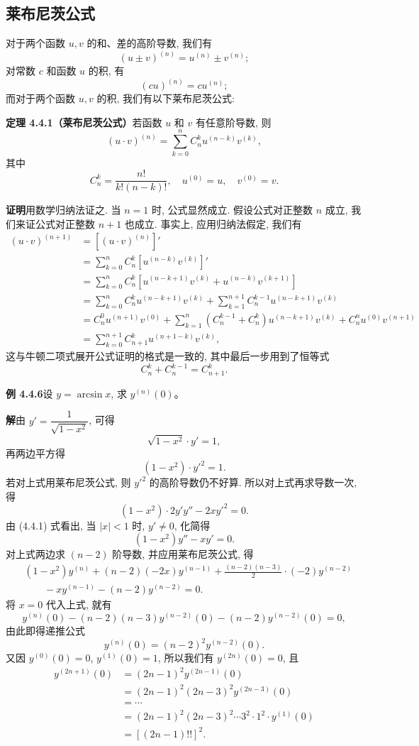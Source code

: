 \documentclass[UTF8,12pt,a4paper,fontset=fandol]{ctexart}
\begin{document}
\subsection{莱布尼茨公式}

对于两个函数 $u,v$ 的和、差的高阶导数, 我们有
\[
  (u\pm v)^{(n)}=u^{(n)}\pm v^{(n)};
\]
对常数 $c$ 和函数 $u$ 的积, 有
\[
  (cu)^{(n)}=cu^{(n)};
\]
而对于两个函数 $u,v$ 的积, 我们有以下莱布尼茨公式:

\noindent\textbf{定理 4.4.1（莱布尼茨公式）}\quad 若函数 $u$ 和 $v$ 有任意阶导数, 则
\[
  (u\cdot v)^{(n)}
  =
  \sum_{k=0}^{n}C_n^ku^{(n-k)}v^{(k)},
\]
其中
\[
  C_n^k=\frac{n!}{k!(n-k)!},\quad u^{(0)}=u,\quad v^{(0)}=v.
\]

\noindent\textbf{证明}\quad 用数学归纳法证之. 当 $n=1$ 时, 公式显然成立. 假设公式对正整数 $n$ 成立, 我们来证公式对正整数 $n+1$ 也成立. 事实上, 应用归纳法假定, 我们有
\[
\begin{aligned}
  (u\cdot v)^{(n+1)}
  &=
  \left[(u\cdot v)^{(n)}\right]'  \\
  &=
  \sum_{k=0}^{n}C_n^k\left[u^{(n-k)}v^{(k)}\right]'  \\
  &=
  \sum_{k=0}^{n}C_n^k
  \left[u^{(n-k+1)}v^{(k)}+u^{(n-k)}v^{(k+1)}\right]  \\
  &=
  \sum_{k=0}^{n}C_n^ku^{(n-k+1)}v^{(k)}
  +
  \sum_{k=1}^{n+1}C_n^{k-1}u^{(n-k+1)}v^{(k)}  \\
  &=
  C_n^0u^{(n+1)}v^{(0)}
  +
  \sum_{k=1}^{n}(C_n^{k-1}+C_n^k)u^{(n-k+1)}v^{(k)}
  +
  C_n^nu^{(0)}v^{(n+1)}  \\
  &=
  \sum_{k=0}^{n+1}C_{n+1}^ku^{(n+1-k)}v^{(k)},
\end{aligned}
\]
这与牛顿二项式展开公式证明的格式是一致的, 其中最后一步用到了恒等式
\[
  C_n^k+C_n^{k-1}=C_{n+1}^k.
\]

\noindent\textbf{例 4.4.6}\quad 设 $y=\arcsin x$, 求 $y^{(n)}(0)$。

\noindent\textbf{解}\quad 由 $y'=\dfrac{1}{\sqrt{1-x^2}}$, 可得
\[
  \sqrt{1-x^2}\cdot y'=1,
\]
再两边平方得
\[
  (1-x^2)\cdot y'^2=1. \tag{4.4.1}
\]
若对上式用莱布尼茨公式, 则 $y'^2$ 的高阶导数仍不好算. 所以对上式再求导数一次, 得
\[
  (1-x^2)\cdot 2y'y''-2xy'^2=0.
\]
由 (4.4.1) 式看出, 当 $|x|<1$ 时, $y'\ne0$, 化简得
\[
  (1-x^2)y''-xy'=0.
\]
对上式两边求 $(n-2)$ 阶导数, 并应用莱布尼茨公式, 得
\[
\begin{aligned}
  &(1-x^2)y^{(n)}
  +(n-2)(-2x)y^{(n-1)}
  +\frac{(n-2)(n-3)}{2}\cdot(-2)y^{(n-2)}  \\
  &\qquad
  -xy^{(n-1)}-(n-2)y^{(n-2)}=0.
\end{aligned}
\]
将 $x=0$ 代入上式, 就有
\[
  y^{(n)}(0)
  -(n-2)(n-3)y^{(n-2)}(0)
  -(n-2)y^{(n-2)}(0)=0,
\]
由此即得递推公式
\[
  y^{(n)}(0)=(n-2)^2y^{(n-2)}(0).
\]
又因 $y^{(0)}(0)=0$, $y^{(1)}(0)=1$, 所以我们有 $y^{(2n)}(0)=0$, 且
\[
\begin{aligned}
  y^{(2n+1)}(0)
  &=
  (2n-1)^2y^{(2n-1)}(0)  \\
  &=
  (2n-1)^2(2n-3)^2y^{(2n-3)}(0)  \\
  &=\cdots  \\
  &=
  (2n-1)^2(2n-3)^2\cdots3^2\cdot1^2\cdot y^{(1)}(0)  \\
  &=
  [(2n-1)!!]^2.
\end{aligned}
\]
\end{document}
